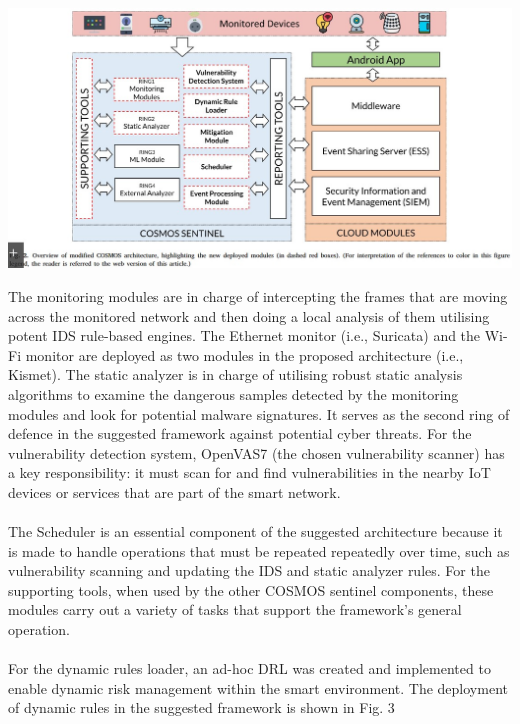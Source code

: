 \documentclass[12pt]{report}
\begin{document}
\begin{center}
\includegraphics[scale=0.5]{Fig2.jpg}\\
\end{center}
\noindent
The monitoring modules are in charge of intercepting the frames that are moving across the monitored network and then doing a local analysis of them utilising potent IDS rule-based engines. The Ethernet monitor (i.e., Suricata) and the Wi-Fi monitor are deployed as two modules in the proposed architecture (i.e., Kismet). The static analyzer is in charge of utilising robust static analysis algorithms to examine the dangerous samples detected by the monitoring modules and look for potential malware signatures. It serves as the second ring of defence in the suggested framework against potential cyber threats. For the vulnerability detection system, OpenVAS7 (the chosen vulnerability scanner) has a key responsibility: it must scan for and find vulnerabilities in the nearby IoT devices or services that are part of the smart network.
\\ \\
The Scheduler is an essential component of the suggested architecture because it is made to handle operations that must be repeated repeatedly over time, such as vulnerability scanning and updating the IDS and static analyzer rules. For the supporting tools, when used by the other COSMOS sentinel components, these modules carry out a variety of tasks that support the framework's general operation.
\\ \\
For the dynamic rules loader, an ad-hoc DRL was created and implemented to enable dynamic risk management within the smart environment. The deployment of dynamic rules in the suggested framework is shown in Fig. 3
\end{document}
